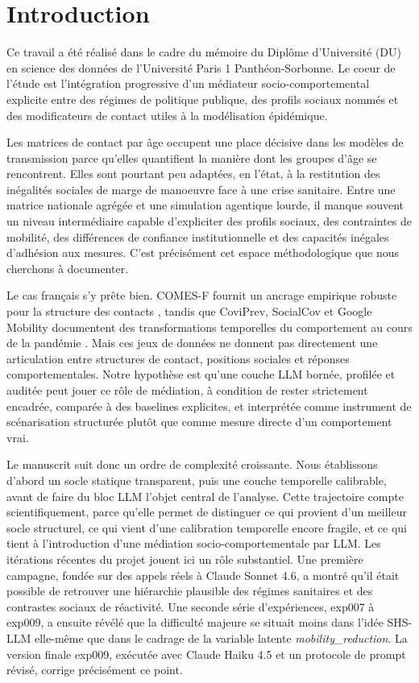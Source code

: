 \documentclass[ROIA,Unicode]{cedram}
\begin{document}
\section{Introduction}
Ce travail a été réalisé dans le cadre du mémoire du Diplôme d'Université (DU) en science des données de l'Université Paris 1 Panthéon-Sorbonne. Le coeur de l'étude est l'intégration progressive d'un médiateur socio-comportemental explicite entre des régimes de politique publique, des profils sociaux nommés et des modificateurs de contact utiles à la modélisation épidémique.

Les matrices de contact par âge occupent une place décisive dans les modèles de transmission parce qu'elles quantifient la manière dont les groupes d'âge se rencontrent. Elles sont pourtant peu adaptées, en l'état, à la restitution des inégalités sociales de marge de manoeuvre face à une crise sanitaire. Entre une matrice nationale agrégée et une simulation agentique lourde, il manque souvent un niveau intermédiaire capable d'expliciter des profils sociaux, des contraintes de mobilité, des différences de confiance institutionnelle et des capacités inégales d'adhésion aux mesures. C'est précisément cet espace méthodologique que nous cherchons à documenter.

Le cas français s'y prête bien. COMES-F fournit un ancrage empirique robuste pour la structure des contacts \citep{beraud2015french}, tandis que CoviPrev, SocialCov et Google Mobility documentent des transformations temporelles du comportement au cours de la pandémie \citep{coviprev2021,socialcov2024,googlemobility2022}. Mais ces jeux de données ne donnent pas directement une articulation entre structures de contact, positions sociales et réponses comportementales. Notre hypothèse est qu'une couche LLM bornée, profilée et auditée peut jouer ce rôle de médiation, à condition de rester strictement encadrée, comparée à des baselines explicites, et interprétée comme instrument de scénarisation structurée plutôt que comme mesure directe d'un comportement vrai.

Le manuscrit suit donc un ordre de complexité croissante. Nous établissons d'abord un socle statique transparent, puis une couche temporelle calibrable, avant de faire du bloc LLM l'objet central de l'analyse. Cette trajectoire compte scientifiquement, parce qu'elle permet de distinguer ce qui provient d'un meilleur socle structurel, ce qui vient d'une calibration temporelle encore fragile, et ce qui tient à l'introduction d'une médiation socio-comportementale par LLM. Les itérations récentes du projet jouent ici un rôle substantiel. Une première campagne, fondée sur des appels réels à Claude Sonnet 4.6, a montré qu'il était possible de retrouver une hiérarchie plausible des régimes sanitaires et des contrastes sociaux de réactivité. Une seconde série d'expériences, exp007 à exp009, a ensuite révélé que la difficulté majeure se situait moins dans l'idée SHS-LLM elle-même que dans le cadrage de la variable latente \emph{mobility\_reduction}. La version finale exp009, exécutée avec Claude Haiku 4.5 et un protocole de prompt révisé, corrige précisément ce point.
\end{document}
